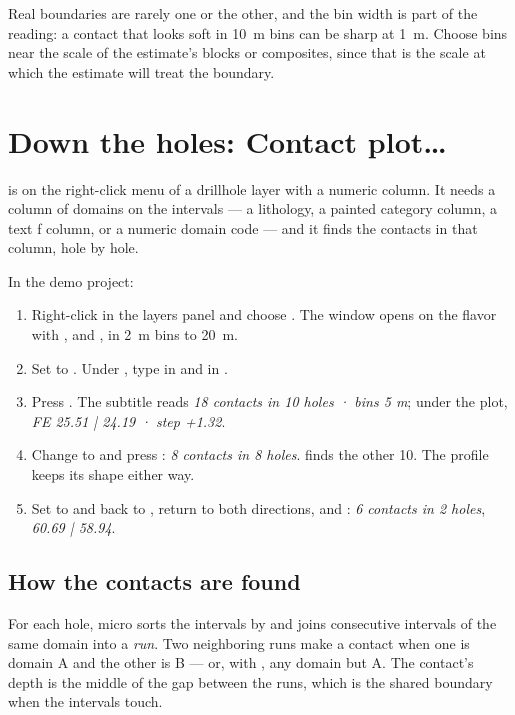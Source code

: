 Real boundaries are rarely one or the other, and the bin width is part of the reading: a contact that looks soft in 10~m bins can be sharp at 1~m. Choose bins near the scale of the estimate's blocks or composites, since that is the scale at which the estimate will treat the boundary.

\section{Down the holes: Contact plot…}\label{sec:contact-downhole}
 is on the right-click menu of a drillhole layer with a numeric column. It needs a column of domains on the intervals — a lithology, a painted category column, a text ƒ column, or a numeric domain code — and it finds the contacts in that column, hole by hole.

\begin{tryit}
In the demo project:
\begin{enumerate}
\item Right-click  in the layers panel and choose . The window opens on the  flavor with ,  and , in 2~m bins to 20~m.
\item Set  to . Under , type  in  and  in .
\item Press . The subtitle reads \emph{18 contacts in 10 holes · bins 5 m}; under the plot, \emph{FE 25.51 | 24.19 · step +1.32}.
\item Change  to  and press : \emph{8 contacts in 8 holes}.  finds the other 10. The profile keeps its shape either way.
\item Set  to  and  back to , return to both directions, and : \emph{6 contacts in 2 holes}, \emph{60.69 | 58.94}.
\end{enumerate}
\end{tryit}


\subsection{How the contacts are found}\label{sec:contact-walk}
For each hole, micro sorts the intervals by  and joins consecutive intervals of the same domain into a \emph{run}. Two neighboring runs make a contact when one is domain A and the other is B — or, with , any domain but A. The contact's depth is the middle of the gap between the runs, which is the shared boundary when the intervals touch.


